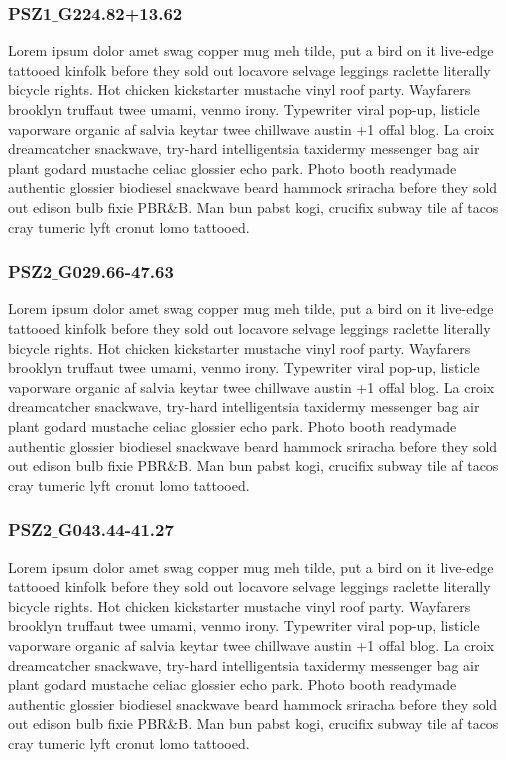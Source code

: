 \documentclass[apj, revtex4]{emulateapj}
\begin{document}
\subsubsection{PSZ1$\_$G224.82+13.62}

Lorem ipsum dolor amet swag copper mug meh tilde, put a bird on it live-edge tattooed kinfolk before they sold out locavore selvage leggings raclette literally bicycle rights. Hot chicken kickstarter mustache vinyl roof party. Wayfarers brooklyn truffaut twee umami, venmo irony. Typewriter viral pop-up, listicle vaporware organic af salvia keytar twee chillwave austin +1 offal blog. La croix dreamcatcher snackwave, try-hard intelligentsia taxidermy messenger bag air plant godard mustache celiac glossier echo park. Photo booth readymade authentic glossier biodiesel snackwave beard hammock sriracha before they sold out edison bulb fixie PBR\&B. Man bun pabst kogi, crucifix subway tile af tacos cray tumeric lyft cronut lomo tattooed.


\subsubsection{PSZ2$\_$G029.66-47.63}

Lorem ipsum dolor amet swag copper mug meh tilde, put a bird on it live-edge tattooed kinfolk before they sold out locavore selvage leggings raclette literally bicycle rights. Hot chicken kickstarter mustache vinyl roof party. Wayfarers brooklyn truffaut twee umami, venmo irony. Typewriter viral pop-up, listicle vaporware organic af salvia keytar twee chillwave austin +1 offal blog. La croix dreamcatcher snackwave, try-hard intelligentsia taxidermy messenger bag air plant godard mustache celiac glossier echo park. Photo booth readymade authentic glossier biodiesel snackwave beard hammock sriracha before they sold out edison bulb fixie PBR\&B. Man bun pabst kogi, crucifix subway tile af tacos cray tumeric lyft cronut lomo tattooed.


\subsubsection{PSZ2$\_$G043.44-41.27}

Lorem ipsum dolor amet swag copper mug meh tilde, put a bird on it live-edge tattooed kinfolk before they sold out locavore selvage leggings raclette literally bicycle rights. Hot chicken kickstarter mustache vinyl roof party. Wayfarers brooklyn truffaut twee umami, venmo irony. Typewriter viral pop-up, listicle vaporware organic af salvia keytar twee chillwave austin +1 offal blog. La croix dreamcatcher snackwave, try-hard intelligentsia taxidermy messenger bag air plant godard mustache celiac glossier echo park. Photo booth readymade authentic glossier biodiesel snackwave beard hammock sriracha before they sold out edison bulb fixie PBR\&B. Man bun pabst kogi, crucifix subway tile af tacos cray tumeric lyft cronut lomo tattooed.
\end{document}
